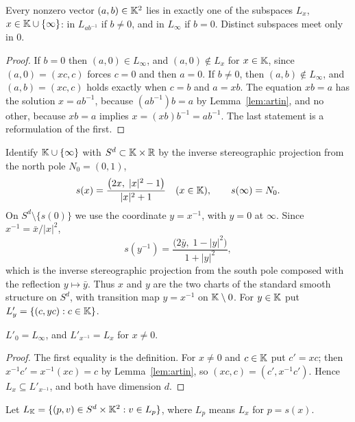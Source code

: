 \begin{proposition}\label{prop:lines}
Every nonzero vector $(a,b)\in\mathbb{K}^2$ lies in exactly one of the subspaces $L_x$, $x\in\mathbb{K}\cup\{\infty\}$: in $L_{ab^{-1}}$ if $b\neq0$, and in $L_\infty$ if $b=0$. Distinct subspaces meet only in $0$.
\end{proposition}

\begin{proof}
If $b=0$ then $(a,0)\in L_\infty$, and $(a,0)\notin L_x$ for $x\in\mathbb{K}$, since $(a,0)=(xc,c)$ forces $c=0$ and then $a=0$. If $b\neq0$, then $(a,b)\notin L_\infty$, and $(a,b)=(xc,c)$ holds exactly when $c=b$ and $a=xb$. The equation $xb=a$ has the solution $x=ab^{-1}$, because $(ab^{-1})b=a$ by Lemma~\ref{lem:artin}, and no other, because $xb=a$ implies $x=(xb)b^{-1}=ab^{-1}$. The last statement is a reformulation of the first.
\end{proof}

Identify $\mathbb{K}\cup\{\infty\}$ with $S^d\subset\mathbb{K}\times\mathbb{R}$ by the inverse stereographic projection from the north pole $N_0=(0,1)$,
\begin{equation}\label{eq:stereo}
s(x)=\frac{\bigl(2x,\;|x|^2-1\bigr)}{|x|^2+1}\quad(x\in\mathbb{K}),\qquad s(\infty)=N_0 .
\end{equation}
On $S^d\setminus\{s(0)\}$ we use the coordinate $y=x^{-1}$, with $y=0$ at $\infty$. Since $x^{-1}=\bar x/|x|^2$,
\begin{equation}\label{eq:stereo2}
s(y^{-1})=\frac{\bigl(2\bar y,\;1-|y|^2\bigr)}{1+|y|^2},
\end{equation}
which is the inverse stereographic projection from the south pole composed with the reflection $y\mapsto\bar y$. Thus $x$ and $y$ are the two charts of the standard smooth structure on $S^d$, with transition map $y=x^{-1}$ on $\mathbb{K}\setminus0$. For $y\in\mathbb{K}$ put $L'_y=\{(c,yc):c\in\mathbb{K}\}$.

\begin{lemma}\label{lem:secondchart}
$L'_0=L_\infty$, and $L'_{x^{-1}}=L_x$ for $x\neq0$.
\end{lemma}

\begin{proof}
The first equality is the definition. For $x\neq0$ and $c\in\mathbb{K}$ put $c'=xc$; then $x^{-1}c'=x^{-1}(xc)=c$ by Lemma~\ref{lem:artin}, so $(xc,c)=(c',x^{-1}c')$. Hence $L_x\subseteq L'_{x^{-1}}$, and both have dimension $d$.
\end{proof}

Let $L_{\mathbb{K}}=\{(p,v)\in S^d\times\mathbb{K}^2: v\in L_{p}\}$, where $L_p$ means $L_x$ for $p=s(x)$.

